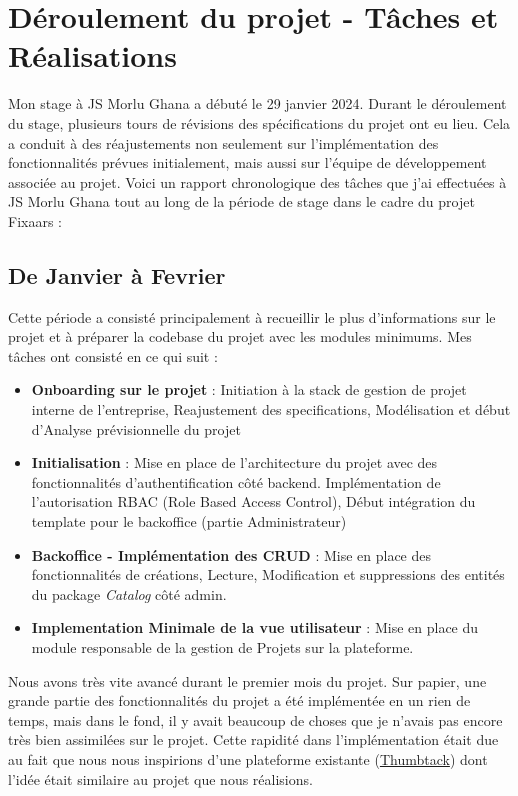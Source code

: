 {\section{Déroulement du projet - Tâches et Réalisations}

Mon stage à JS Morlu Ghana a débuté le 29 janvier 2024. Durant le déroulement du stage, plusieurs tours de révisions des spécifications du projet ont eu lieu. Cela a conduit à des réajustements non seulement sur l'implémentation des fonctionnalités prévues initialement, mais aussi sur l'équipe de développement associée au projet. Voici un rapport chronologique des tâches que j'ai effectuées à JS Morlu Ghana tout au long de la période de stage dans le cadre du projet Fixaars :

\subsection*{De Janvier à Fevrier} 

Cette période a consisté principalement à recueillir le plus d'informations sur le projet et à préparer la codebase du projet avec les modules minimums. Mes tâches ont consisté en ce qui suit :\\ 

\begin{itemize}
    \item \textbf{Onboarding sur le projet} : Initiation à la stack de gestion de projet interne de l'entreprise, Reajustement des specifications, Modélisation et début d'Analyse prévisionnelle du projet
    \item \textbf{Initialisation} : Mise en place de l'architecture du projet avec des fonctionnalités d'authentification côté backend. Implémentation de l'autorisation RBAC (Role Based Access Control), Début intégration du template pour le backoffice (partie Administrateur)
    \item \textbf{ Backoffice - Implémentation des CRUD} : Mise en place des fonctionnalités de créations, Lecture, Modification et suppressions des entités du package \textit{Catalog} côté admin.
    \item \textbf{Implementation Minimale de la vue utilisateur} : Mise en place du module responsable de la gestion de Projets sur la plateforme.
\end{itemize}

\vspace{1cm}
Nous avons très vite avancé durant le premier mois du projet. Sur papier, une grande partie des fonctionnalités du projet a été implémentée en un rien de temps, mais dans le fond, il y avait beaucoup de choses que je n'avais pas encore très bien assimilées sur le projet. Cette rapidité dans l'implémentation était due au fait que nous nous inspirions d'une plateforme existante (\href{https://www.thumbtack.com/}{Thumbtack}) dont l'idée était similaire au projet que nous réalisions.

}
